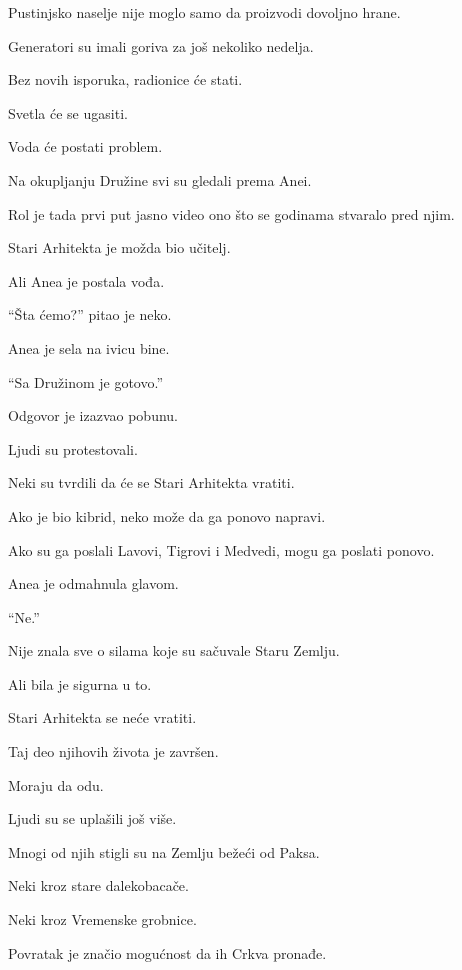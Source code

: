 Pustinjsko naselje nije moglo samo da proizvodi dovoljno hrane.

Generatori su imali goriva za još nekoliko nedelja.

Bez novih isporuka, radionice će stati.

Svetla će se ugasiti.

Voda će postati problem.

\bigskip

Na okupljanju Družine svi su gledali prema Anei.

Rol je tada prvi put jasno video ono što se godinama stvaralo pred njim.

Stari Arhitekta je možda bio učitelj.

Ali Anea je postala vođa.

\bigskip

``Šta ćemo?'' pitao je neko.

Anea je sela na ivicu bine.

``Sa Družinom je gotovo.''

\bigskip

Odgovor je izazvao pobunu.

Ljudi su protestovali.

Neki su tvrdili da će se Stari Arhitekta vratiti.

Ako je bio kibrid, neko može da ga ponovo napravi.

Ako su ga poslali Lavovi, Tigrovi i Medvedi, mogu ga poslati ponovo.

\bigskip

Anea je odmahnula glavom.

``Ne.''

\bigskip

Nije znala sve o silama koje su sačuvale Staru Zemlju.

Ali bila je sigurna u to.

Stari Arhitekta se neće vratiti.

Taj deo njihovih života je završen.

\bigskip

Moraju da odu.

\bigskip

Ljudi su se uplašili još više.

Mnogi od njih stigli su na Zemlju bežeći od Paksa.

Neki kroz stare dalekobacače.

Neki kroz Vremenske grobnice.

Povratak je značio mogućnost da ih Crkva pronađe.

